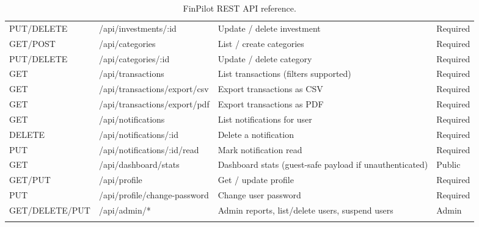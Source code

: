 \documentclass[11pt,a4paper]{report}
\begin{document}
\begin{longtable}{l L{4.9cm} L{5.2cm} l}
PUT/DELETE & /api/investments/:id & Update / delete investment & Required \\
GET/POST & /api/categories & List / create categories & Required \\
PUT/DELETE & /api/categories/:id & Update / delete category & Required \\
GET & /api/transactions & List transactions (filters supported) & Required \\
GET & /api/transactions/export/csv & Export transactions as CSV & Required \\
GET & /api/transactions/export/pdf & Export transactions as PDF & Required \\
GET & /api/notifications & List notifications for user & Required \\
DELETE & /api/notifications/:id & Delete a notification & Required \\
PUT & /api/notifications/:id/read & Mark notification read & Required \\
GET & /api/dashboard/stats & Dashboard stats (guest-safe payload if unauthenticated) & Public \\
GET/PUT & /api/profile & Get / update profile & Required \\
PUT & /api/profile/change-password & Change user password & Required \\
GET/DELETE/PUT & /api/admin/* & Admin reports, list/delete users, suspend users & Admin \\
\caption{FinPilot REST API reference.}
\end{longtable}

\end{document}
